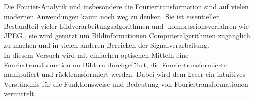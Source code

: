 
Die Fourier-Analytik und insbesondere die Fouriertransformation sind auf vielen modernen Anwendungen kaum noch weg zu denken. Sie ist essentieller Bestandteil vieler Bildverarbeitungsalgorithmen \cite{easton_fourier_2010} und -kompressionsverfahren wie JPEG \cite{_jpeg_2015}, sie wird genutzt um Bildinformationen Computeralgorithmen zugänglich zu machen \cite{prof._dr._norbert_link_vorlesungsscript:_????} und in vielen anderen Bereichen der Signalverarbeitung.\\

In diesem Versuch wird mit einfachen optischen Mitteln eine Fouriertransformation an Bildern durchgeführt, die Fouriertransformierte manipuliert und rücktransformiert werden. Dabei wird dem Leser ein intuitives Verständnis für die Funktionsweise und Bedeutung von Fouriertransformationen vermittelt.